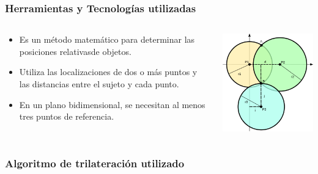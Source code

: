 \begin{frame}
	\frametitle{Herramientas y Tecnologías utilizadas}
	\begin{columns}
			\begin{column}{0.6\textwidth}
					\begin{itemize}
						\item {Es un método matemático para determinar las posiciones relativasde objetos.}
						\item {Utiliza las localizaciones de dos o más puntos y las distancias entre el sujeto y cada punto.}
						\item {En un plano bidimensional, se necesitan al menos tres puntos de referencia.}
					\end{itemize}
				\endblock{}
			\end{column}
			\begin{column}{0.4\textwidth}
				\vfill 
					\begin{center}
						\includegraphics[width=0.8\linewidth]{Images/trilateration}
					\end{center}
			\end{column}
	\end{columns}
\end{frame}

\begin{frame}
	\frametitle{Algoritmo de trilateración utilizado}
	
\end{frame}

